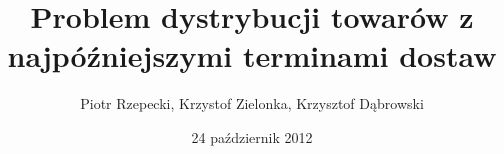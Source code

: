 \documentclass{beamer}
\title{Problem  dystrybucji towarów z najpóźniejszymi terminami dostaw}
\author{Piotr Rzepecki, Krzystof Zielonka, Krzysztof Dąbrowski}
\date{24 październik 2012}
\begin{document}
\frame{\titlepage}





%

%

%	

%	

%	

%	

%	


%	

%	 
\end{document}
